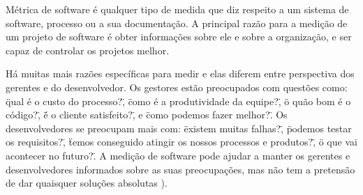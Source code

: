 Métrica de software é qualquer tipo de medida que diz respeito a um sistema de software, processo ou a sua documentação. A principal razão para a medição de um projeto de software é obter informações sobre ele e sobre a organização, e ser capaz de controlar os projetos melhor.

Há muitas mais razões específicas para medir e elas diferem entre perspectiva dos gerentes e do desenvolvedor. Os gestores estão preocupados com questões como: \"qual é o custo do processo?\", \"como é a produtividade da equipe?\", \"o quão bom é o código?\", \"é o cliente satisfeito?\", e \"como podemos fazer melhor?\". Os desenvolvedores se preocupam mais com: \"existem muitas falhas?\", \"podemos testar os requisitos?\", \"temos conseguido atingir os nossos processos e produtos?\", \"o que vai acontecer no futuro?\". A medição de software pode ajudar a manter os gerentes e desenvolvedores informados sobre as suas preocupações, mas não tem a pretensão de dar quaisquer soluções absolutas \cite{lindstrom2004software}).
